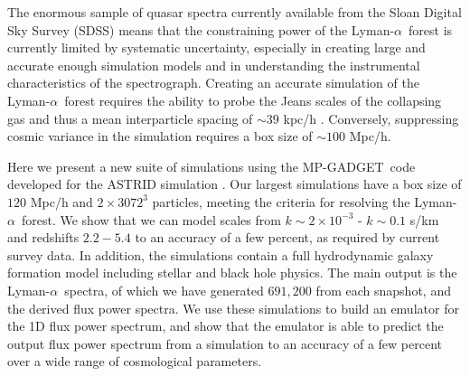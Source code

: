 \documentclass[a4paper,11pt]{article}
\newcommand{\Lya}{Lyman-$\alpha$}
\newcommand{\mpgadget}{{\small MP-GADGET}}
\begin{document}
The enormous sample of quasar spectra currently available from the Sloan Digital Sky Survey (SDSS) means that the constraining power of the \Lya~forest is currently limited by systematic uncertainty, especially in creating large and accurate enough simulation models and in understanding the instrumental characteristics of the spectrograph.
Creating an accurate simulation of the \Lya~forest requires the ability to probe the Jeans scales of the collapsing gas and thus a mean interparticle spacing of $\sim 39$ kpc/h \cite{Borde:2014}. Conversely, suppressing cosmic variance in the simulation requires a box size of $\sim 100$ Mpc/h.

Here we present a new suite of simulations using the \mpgadget~code developed for the ASTRID simulation \cite{Ni:2021, Bird:2022}. Our largest simulations have a box size of $120$ Mpc/h and $2\times 3072^3$ particles, meeting the criteria for resolving the \Lya~forest.
We show that we can model scales from $k \sim 2\times 10^{-3}$ - $k \sim 0.1$ s/km and redshifts $2.2 - 5.4$ to an accuracy of a few percent, as required by current survey data. In addition, the simulations contain a full hydrodynamic galaxy formation model including stellar and black hole physics. The main output is the \Lya~spectra, of which we have generated $691,200$ from each snapshot, and the derived flux power spectra.
We use these simulations to build an emulator for the 1D flux power spectrum, and show that the emulator is able to predict the output flux power spectrum from a simulation to an accuracy of a few percent over a wide range of cosmological parameters.
\end{document}
